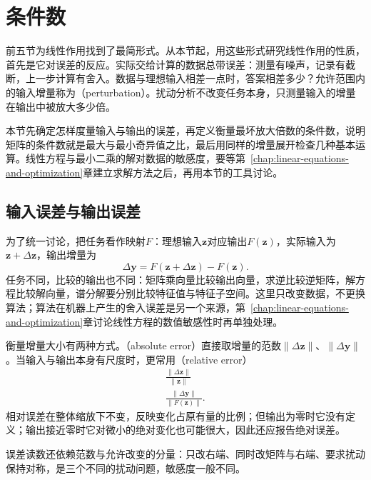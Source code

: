 
\section{条件数}
\label{sec:ls-perturbation}
\label{sec:linear-algebra-stability}
\label{sec:matrix-analysis-conditioning-perturbation}

前五节为线性作用找到了最简形式。从本节起，用这些形式研究线性作用的性质，首先是它对误差的反应。实际交给计算的数据总带误差：测量有噪声，记录有截断，上一步计算有舍入。数据与理想输入相差一点时，答案相差多少？允许范围内的输入增量称为（perturbation）。扰动分析不改变任务本身，只测量输入的增量在输出中被放大多少倍。

本节先确定怎样度量输入与输出的误差，再定义衡量最坏放大倍数的条件数，说明矩阵的条件数就是最大与最小奇异值之比，最后用同样的增量展开检查几种基本运算。线性方程与最小二乘的解对数据的敏感度，要等第~\ref{chap:linear-equations-and-optimization}章建立求解方法之后，再用本节的工具讨论。

\subsection{输入误差与输出误差}

为了统一讨论，把任务看作映射$F$：理想输入$\bm z$对应输出$F(\bm z)$，实际输入为$\bm z+\Delta\bm z$，输出增量为
\[
 \Delta\bm y=F(\bm z+\Delta\bm z)-F(\bm z).
\]
任务不同，比较的输出也不同：矩阵乘向量比较输出向量，求逆比较逆矩阵，解方程比较解向量，谱分解要分别比较特征值与特征子空间。这里只改变数据，不更换算法；算法在机器上产生的舍入误差是另一个来源，第~\ref{chap:linear-equations-and-optimization}章讨论线性方程的数值敏感性时再单独处理。

衡量增量大小有两种方式。（absolute error）直接取增量的范数$\lVert\Delta\bm z\rVert$、$\lVert\Delta\bm y\rVert$。当输入与输出本身有尺度时，更常用（relative error）
\[
\begin{gathered}
\frac{\lVert\Delta\bm z\rVert}{\lVert\bm z\rVert}\\
\frac{\lVert\Delta\bm y\rVert}{\lVert F(\bm z)\rVert}.
\end{gathered}
\]
相对误差在整体缩放下不变，反映变化占原有量的比例；但输出为零时它没有定义；输出接近零时它对微小的绝对变化也可能很大，因此还应报告绝对误差。

误差读数还依赖范数与允许改变的分量：只改右端、同时改矩阵与右端、要求扰动保持对称，是三个不同的扰动问题，敏感度一般不同。

